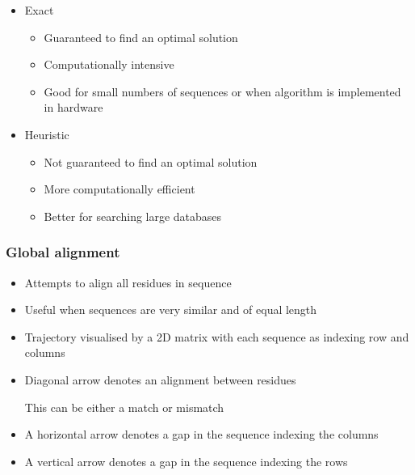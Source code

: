 \documentclass[a4paper]{article}
\begin{document}
\begin{itemize}
  \item
    Exact

    \begin{itemize}
      \item
        Guaranteed to find an optimal solution

      \item
        Computationally intensive

      \item
        Good for small numbers of sequences or when algorithm is implemented in
        hardware
    \end{itemize}

  \item
    Heuristic

    \begin{itemize}
      \item
        Not guaranteed to find an optimal solution

      \item
        More computationally efficient

      \item
        Better for searching large databases
    \end{itemize}
\end{itemize}

\subsubsection{Global alignment}

\begin{itemize}
  \item
    Attempts to align all residues in sequence

  \item
    Useful when sequences are very similar and of equal length
\end{itemize}


\begin{itemize}
  \item
    Trajectory visualised by a 2D matrix with each sequence as indexing row and
    columns

  \item
    Diagonal arrow denotes an alignment between residues

    This can be either a match or mismatch

  \item
    A horizontal arrow denotes a gap in the sequence indexing the columns

  \item
    A vertical arrow denotes a gap in the sequence indexing the rows
\end{itemize}
\end{document}
